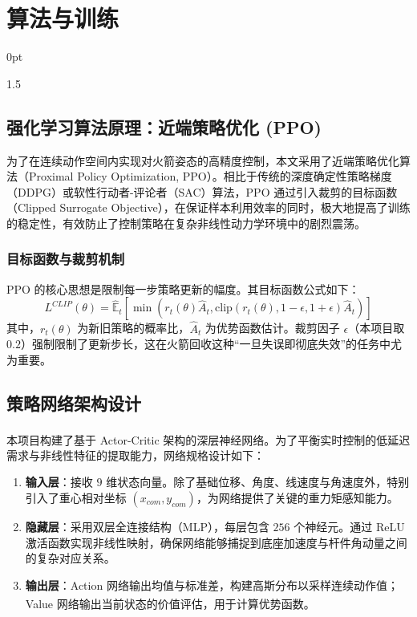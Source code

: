 \documentclass[zihao=-4]{ctexart}
\newcommand{\upcite}[1]{\textsuperscript{\cite{#1}}}
\newcommand{\setParDis}{\setlength {\parskip} {0pt} }
\begin{document}
\section{算法与训练}
\setParDis
\begin{spacing}{1.5}

\subsection{强化学习算法原理：近端策略优化 (PPO)}
为了在连续动作空间内实现对火箭姿态的高精度控制，本文采用了近端策略优化算法（Proximal Policy Optimization, PPO）。相比于传统的深度确定性策略梯度（DDPG）或软性行动者-评论者（SAC）算法，PPO 通过引入裁剪的目标函数（Clipped Surrogate Objective），在保证样本利用效率的同时，极大地提高了训练的稳定性，有效防止了控制策略在复杂非线性动力学环境中的剧烈震荡。

\subsubsection{目标函数与裁剪机制}
PPO 的核心思想是限制每一步策略更新的幅度。其目标函数公式如下：
\begin{equation}
L^{CLIP}(\theta) = \hat{\mathbb{E}}_t \left[ \min \left( r_t(\theta) \hat{A}_t, \text{clip}(r_t(\theta), 1-\epsilon, 1+\epsilon) \hat{A}_t \right) \right]
\end{equation}
其中，$r_t(\theta)$ 为新旧策略的概率比，$\hat{A}_t$ 为优势函数估计。裁剪因子 $\epsilon$（本项目取 $0.2$）强制限制了更新步长，这在火箭回收这种“一旦失误即彻底失效”的任务中尤为重要。



\subsection{策略网络架构设计}
本项目构建了基于 Actor-Critic \upcite{Konda1999ActorCritic}架构的深层神经网络。为了平衡实时控制的低延迟需求与非线性特征的提取能力，网络规格设计如下：

\begin{enumerate}
    \item \textbf{输入层}：接收 $9$ 维状态向量。除了基础位移、角度、线速度与角速度外，特别引入了重心相对坐标 $(x_{com}, y_{com})$，为网络提供了关键的重力矩感知能力。
    \item \textbf{隐藏层}：采用双层全连接结构（MLP），每层包含 $256$ 个神经元。通过 ReLU 激活函数实现非线性映射，确保网络能够捕捉到底座加速度与杆件角动量之间的复杂对应关系。
    \item \textbf{输出层}：Action 网络输出均值与标准差，构建高斯分布以采样连续动作值；Value 网络输出当前状态的价值评估，用于计算优势函数\upcite{Williams1992REINFORCE}。
\end{enumerate}




\end{spacing}
\end{document}
